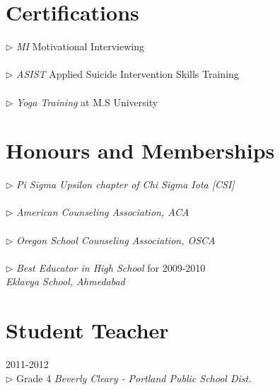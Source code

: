 \documentclass[10pt]{article} %
\begin{document}
{\begin{minipage}[t]{0.44\textwidth}
\section{Certifications} 
$\triangleright$ \textit{MI} Motivational Interviewing \\
\\
$\triangleright$ \textit{ASIST} Applied Suicide Intervention Skills Training \\
\\
$\triangleright$ \textit{Yoga Training} at M.S University\\

\section{Honours and Memberships} 
$\triangleright$ \textit{Pi Sigma Upsilon chapter of Chi Sigma Iota [CSI]} \\
\\
$\triangleright$ \textit{American Counseling Association, ACA} \\
\\
$\triangleright$ \textit{Oregon School Counseling Association, OSCA} \\
\\
$\triangleright$ \textit{Best Educator in High School} for 2009-2010 \\
\textit{Eklavya School, Ahmedabad}\\

\section{Student Teacher} 
{\raggedright 2011-2012 \\
$\triangleright$ Grade 4 \textit{Beverly Cleary - Portland Public School Dist.}\\[5pt]}



\end{minipage}}
\end{document}
